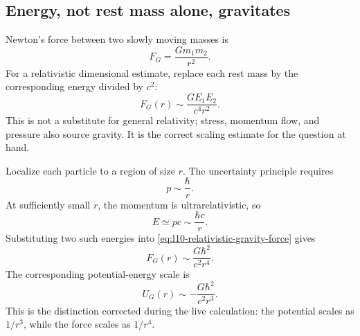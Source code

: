 \subsection{Energy, not rest mass alone, gravitates}

Newton's force between two slowly moving masses is
\begin{equation}
  F_G=\frac{Gm_1m_2}{r^2}.
  \label{eq:l10-newton-force}
\end{equation}
For a relativistic dimensional estimate, replace each rest mass by the
corresponding energy divided by \(c^2\):
\begin{equation}
  F_G(r)\sim\frac{GE_1E_2}{c^4r^2}.
  \label{eq:l10-relativistic-gravity-force}
\end{equation}
This is not a substitute for general relativity; stress, momentum flow, and
pressure also source gravity. It is the correct scaling estimate for the
question at hand.

Localize each particle to a region of size \(r\). The uncertainty
principle requires
\begin{equation}
  p\sim\frac{\hbar}{r}.
  \label{eq:l10-localization-momentum}
\end{equation}
At sufficiently small \(r\), the momentum is ultrarelativistic, so
\begin{equation}
  E\simeq pc\sim\frac{\hbar c}{r}.
  \label{eq:l10-localization-energy}
\end{equation}
Substituting two such energies into
\eqref{eq:l10-relativistic-gravity-force} gives
\begin{equation}
  F_G(r)
  \sim
  \frac{G\hbar^2}{c^2r^4}.
  \label{eq:l10-short-distance-gravity-force}
\end{equation}
The corresponding potential-energy scale is
\begin{equation}
  U_G(r)\sim-\frac{G\hbar^2}{c^2r^3}.
  \label{eq:l10-short-distance-gravity-potential}
\end{equation}
This is the distinction corrected during the live calculation:
the potential scales as \(1/r^3\), while the force scales as \(1/r^4\).

\begin{classroomqa}
\end{classroomqa}

